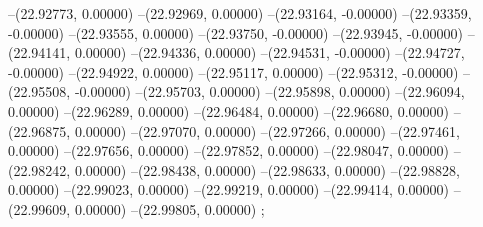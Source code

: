 --(22.92773, 0.00000)
--(22.92969, 0.00000)
--(22.93164, -0.00000)
--(22.93359, -0.00000)
--(22.93555, 0.00000)
--(22.93750, -0.00000)
--(22.93945, -0.00000)
--(22.94141, 0.00000)
--(22.94336, 0.00000)
--(22.94531, -0.00000)
--(22.94727, -0.00000)
--(22.94922, 0.00000)
--(22.95117, 0.00000)
--(22.95312, -0.00000)
--(22.95508, -0.00000)
--(22.95703, 0.00000)
--(22.95898, 0.00000)
--(22.96094, 0.00000)
--(22.96289, 0.00000)
--(22.96484, 0.00000)
--(22.96680, 0.00000)
--(22.96875, 0.00000)
--(22.97070, 0.00000)
--(22.97266, 0.00000)
--(22.97461, 0.00000)
--(22.97656, 0.00000)
--(22.97852, 0.00000)
--(22.98047, 0.00000)
--(22.98242, 0.00000)
--(22.98438, 0.00000)
--(22.98633, 0.00000)
--(22.98828, 0.00000)
--(22.99023, 0.00000)
--(22.99219, 0.00000)
--(22.99414, 0.00000)
--(22.99609, 0.00000)
--(22.99805, 0.00000)
;
